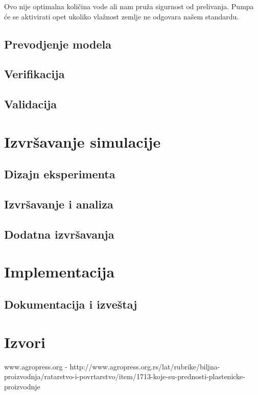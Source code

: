 \documentclass[a4paper,11pt]{book}
\begin{document}
Ovo nije optimalna količina vode ali nam pruža sigurnost od prelivanja. Pumpa će se aktivirati opet ukoliko vlažnost zemlje ne odgovara našem standardu.

\section{Prevodjenje modela}

\section{Verifikacija}
 
\section{Validacija}

\chapter{Izvršavanje simulacije}

\section{Dizajn eksperimenta}

\section{Izvršavanje i analiza}

\section{Dodatna izvršavanja}

\chapter{Implementacija}

\section{Dokumentacija i izveštaj}

\chapter{Izvori}

www.agropress.org - http://www.agropress.org.rs/lat/rubrike/biljna-proizvodnja/ratarstvo-i-povrtarstvo/item/1713-koje-su-prednosti-plastenicke-proizvodnje
\end{document}
